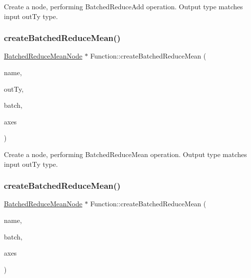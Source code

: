 Create a node, performing Batched\+Reduce\+Add operation. Output type matches input {\ttfamily out\+Ty} type. \mbox{\label{classglow_1_1_function_ad4c8059d320a828aa4f6909804128479}} 
\subsubsection{\texorpdfstring{create\+Batched\+Reduce\+Mean()}{createBatchedReduceMean()}\hspace{0.1cm}{\footnotesize\ttfamily [1/2]}}
{\footnotesize\ttfamily \hyperlink{classglow_1_1_batched_reduce_mean_node}{Batched\+Reduce\+Mean\+Node} $\ast$ Function\+::create\+Batched\+Reduce\+Mean (\begin{DoxyParamCaption}\item[{llvm\+::\+String\+Ref}]{name,  }\item[{\hyperlink{structglow_1_1_type}{Type\+Ref}}]{out\+Ty,  }\item[{\hyperlink{structglow_1_1_node_value}{Node\+Value}}]{batch,  }\item[{llvm\+::\+Array\+Ref$<$ \hyperlink{namespaceglow_a0ca574644e1e42ef193a9947fb4d8911}{unsigned\+\_\+t} $>$}]{axes }\end{DoxyParamCaption})}

Create a node, performing Batched\+Reduce\+Mean operation. Output type matches input {\ttfamily out\+Ty} type. \mbox{\label{classglow_1_1_function_aeb5d9dca40362f4088f9e6db5c41b0ee}} 
\subsubsection{\texorpdfstring{create\+Batched\+Reduce\+Mean()}{createBatchedReduceMean()}\hspace{0.1cm}{\footnotesize\ttfamily [2/2]}}
{\footnotesize\ttfamily \hyperlink{classglow_1_1_batched_reduce_mean_node}{Batched\+Reduce\+Mean\+Node} $\ast$ Function\+::create\+Batched\+Reduce\+Mean (\begin{DoxyParamCaption}\item[{llvm\+::\+String\+Ref}]{name,  }\item[{\hyperlink{structglow_1_1_node_value}{Node\+Value}}]{batch,  }\item[{llvm\+::\+Array\+Ref$<$ \hyperlink{namespaceglow_a0ca574644e1e42ef193a9947fb4d8911}{unsigned\+\_\+t} $>$}]{axes }\end{DoxyParamCaption})}

